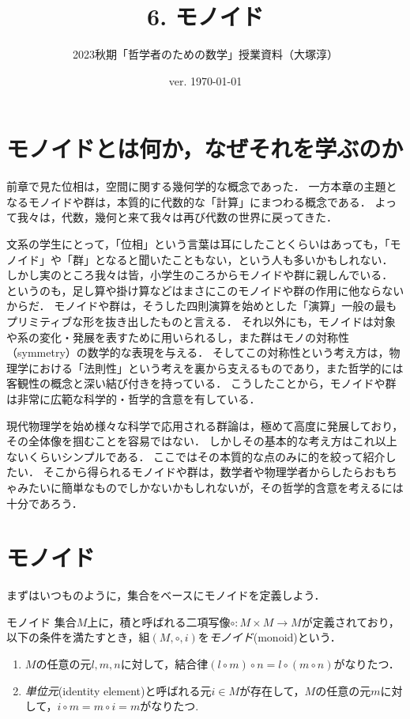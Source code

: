 \documentclass[11pt,a4paper, dvipdfmx]{jsarticle}
\begin{document}
\title{6. モノイド}
\author{2023秋期「哲学者のための数学」授業資料（大塚淳）}
\date{ver. \today}
\maketitle

\section{モノイドとは何か，なぜそれを学ぶのか}
前章で見た位相は，空間に関する幾何学的な概念であった．
一方本章の主題となるモノイドや群は，本質的に代数的な「計算」にまつわる概念である．
よって我々は，代数，幾何と来て我々は再び代数の世界に戻ってきた．

文系の学生にとって，「位相」という言葉は耳にしたことくらいはあっても，「モノイド」や「群」となると聞いたこともない，という人も多いかもしれない．
しかし実のところ我々は皆，小学生のころからモノイドや群に親しんでいる．
というのも，足し算や掛け算などはまさにこのモノイドや群の作用に他ならないからだ．
モノイドや群は，そうした四則演算を始めとした「演算」一般の最もプリミティブな形を抜き出したものと言える．
それ以外にも，モノイドは対象や系の変化・発展を表すために用いられるし，また群はモノの対称性（symmetry）の数学的な表現を与える．
そしてこの対称性という考え方は，物理学における「法則性」という考えを裏から支えるものであり，また哲学的には客観性の概念と深い結び付きを持っている．
こうしたことから，モノイドや群は非常に広範な科学的・哲学的含意を有している．

現代物理学を始め様々な科学で応用される群論は，極めて高度に発展しており，その全体像を掴むことを容易ではない．
しかしその基本的な考え方はこれ以上ないくらいシンプルである．
ここではその本質的な点のみに的を絞って紹介したい．
そこから得られるモノイドや群は，数学者や物理学者からしたらおもちゃみたいに簡単なものでしかないかもしれないが，その哲学的含意を考えるには十分であろう．

\section{モノイド}
まずはいつものように，集合をベースにモノイドを定義しよう．

\begin{dfn}{モノイド}
集合$M$上に，積と呼ばれる二項写像$\circ: M \times M \to M$が定義されており，以下の条件を満たすとき，組$(M, \circ, i)$を\emph{モノイド}(monoid)という．
\begin{enumerate}
 \item $M$の任意の元$l, m, n$に対して，結合律$(l \circ m) \circ n = l \circ (m \circ n)$がなりたつ．
 \item \emph{単位元}(identity element)と呼ばれる元$i \in M$が存在して，$M$の任意の元$m$に対して，$i \circ m = m \circ i = m$がなりたつ.
\end{enumerate} 
\end{dfn}
\end{document}
